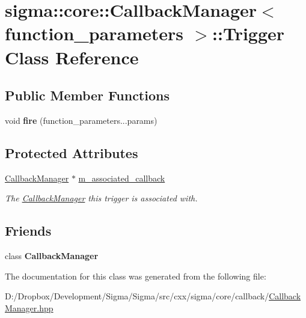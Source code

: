 \hypertarget{classsigma_1_1core_1_1_callback_manager_1_1_trigger}{}\section{sigma\+:\+:core\+:\+:Callback\+Manager$<$ function\+\_\+parameters $>$\+:\+:Trigger Class Reference}
\label{classsigma_1_1core_1_1_callback_manager_1_1_trigger}
\subsection*{Public Member Functions}
\begin{DoxyCompactItemize}
\item 
\hypertarget{classsigma_1_1core_1_1_callback_manager_1_1_trigger_ae4d99890b6524b798c9fcb232c5946b6}{}void {\bfseries fire} (function\+\_\+parameters...\+params)\label{classsigma_1_1core_1_1_callback_manager_1_1_trigger_ae4d99890b6524b798c9fcb232c5946b6}

\end{DoxyCompactItemize}
\subsection*{Protected Attributes}
\begin{DoxyCompactItemize}
\item 
\hypertarget{classsigma_1_1core_1_1_callback_manager_1_1_trigger_a2c63d87443c7b86ea3bbdf558ce8b67c}{}\hyperlink{classsigma_1_1core_1_1_callback_manager}{Callback\+Manager} $\ast$ \hyperlink{classsigma_1_1core_1_1_callback_manager_1_1_trigger_a2c63d87443c7b86ea3bbdf558ce8b67c}{m\+\_\+associated\+\_\+callback}\label{classsigma_1_1core_1_1_callback_manager_1_1_trigger_a2c63d87443c7b86ea3bbdf558ce8b67c}

\begin{DoxyCompactList}\small\item\em The \hyperlink{classsigma_1_1core_1_1_callback_manager}{Callback\+Manager} this trigger is associated with. \end{DoxyCompactList}\end{DoxyCompactItemize}
\subsection*{Friends}
\begin{DoxyCompactItemize}
\item 
\hypertarget{classsigma_1_1core_1_1_callback_manager_1_1_trigger_ae5d6c530b487c04e4f42fd53d289dada}{}class {\bfseries Callback\+Manager}\label{classsigma_1_1core_1_1_callback_manager_1_1_trigger_ae5d6c530b487c04e4f42fd53d289dada}

\end{DoxyCompactItemize}


The documentation for this class was generated from the following file\+:\begin{DoxyCompactItemize}
\item 
D\+:/\+Dropbox/\+Development/\+Sigma/\+Sigma/src/cxx/sigma/core/callback/\hyperlink{_callback_manager_8hpp}{Callback\+Manager.\+hpp}\end{DoxyCompactItemize}
